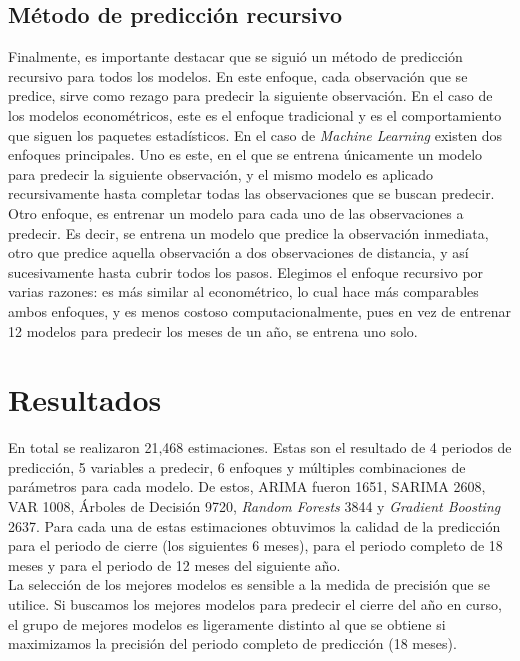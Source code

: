 \documentclass[a4paper, 11pt]{article}
\begin{document}
\subsection*{Método de predicción recursivo}
Finalmente, es importante destacar que se siguió un método de predicción recursivo para todos los modelos. En este enfoque, cada observación que se predice, sirve como rezago para predecir la siguiente observación. En el caso de los modelos econométricos, este es el enfoque tradicional y es el comportamiento que siguen los paquetes estadísticos. En el caso de \textit{Machine Learning} existen dos enfoques principales. Uno es este, en el que se entrena únicamente un modelo para predecir la siguiente observación, y el mismo modelo es aplicado recursivamente hasta completar todas las observaciones que se buscan predecir. Otro enfoque, es entrenar un modelo para cada uno de las observaciones a predecir. Es decir, se entrena un modelo que predice la observación inmediata, otro que predice aquella observación a dos observaciones de distancia, y así sucesivamente hasta cubrir todos los pasos. Elegimos el enfoque recursivo por varias razones: es más similar al econométrico, lo cual hace más comparables ambos enfoques, y es menos costoso computacionalmente, pues en vez de entrenar 12 modelos para predecir los meses de un año, se entrena uno solo.

\section*{Resultados}

En total se realizaron 21,468 estimaciones. Estas son el resultado de 4 periodos de predicción, 5 variables a predecir, 6 enfoques y múltiples combinaciones de parámetros para cada modelo. De estos, ARIMA  fueron 1651, SARIMA 2608, VAR 1008, Árboles de Decisión 9720, \textit{Random Forests} 3844 y \textit{Gradient Boosting} 2637. Para cada una de estas estimaciones obtuvimos la calidad de la predicción para el periodo de cierre (los siguientes 6 meses), para el periodo completo de 18 meses y para el periodo de 12 meses del siguiente año.\\

La selección de los mejores modelos es sensible a la medida de precisión que se utilice. Si buscamos los mejores modelos para predecir el cierre del año en curso, el grupo de mejores modelos es ligeramente distinto al que se obtiene si maximizamos la precisión del periodo completo de predicción (18 meses). \\
\end{document}
